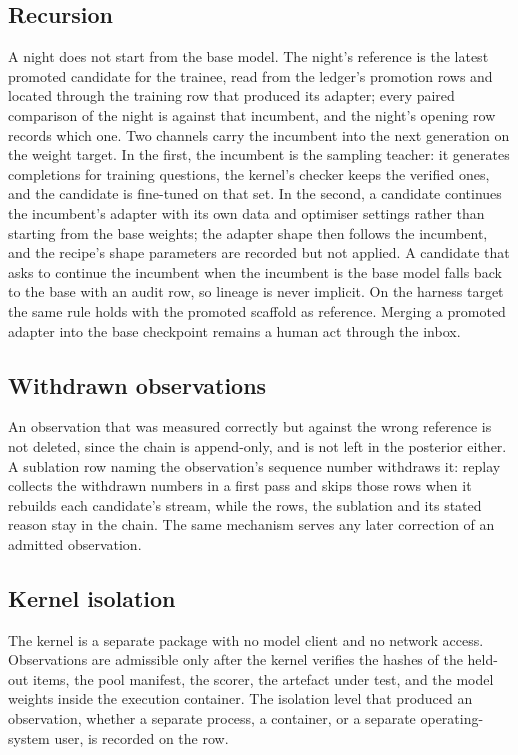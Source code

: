 \subsection{Recursion}
A night does not start from the base model. The night's reference is the latest promoted candidate for the trainee, read from the ledger's promotion rows and located through the training row that produced its adapter; every paired comparison of the night is against that incumbent, and the night's opening row records which one. Two channels carry the incumbent into the next generation on the weight target. In the first, the incumbent is the sampling teacher: it generates completions for training questions, the kernel's checker keeps the verified ones, and the candidate is fine-tuned on that set. In the second, a candidate continues the incumbent's adapter with its own data and optimiser settings rather than starting from the base weights; the adapter shape then follows the incumbent, and the recipe's shape parameters are recorded but not applied. A candidate that asks to continue the incumbent when the incumbent is the base model falls back to the base with an audit row, so lineage is never implicit. On the harness target the same rule holds with the promoted scaffold as reference. Merging a promoted adapter into the base checkpoint remains a human act through the inbox.

\subsection{Withdrawn observations}
An observation that was measured correctly but against the wrong reference is not deleted, since the chain is append-only, and is not left in the posterior either. A sublation row naming the observation's sequence number withdraws it: replay collects the withdrawn numbers in a first pass and skips those rows when it rebuilds each candidate's stream, while the rows, the sublation and its stated reason stay in the chain. The same mechanism serves any later correction of an admitted observation.

\subsection{Kernel isolation}
The kernel is a separate package with no model client and no network access. Observations are admissible only after the kernel verifies the hashes of the held-out items, the pool manifest, the scorer, the artefact under test, and the model weights inside the execution container. The isolation level that produced an observation, whether a separate process, a container, or a separate operating-system user, is recorded on the row.

